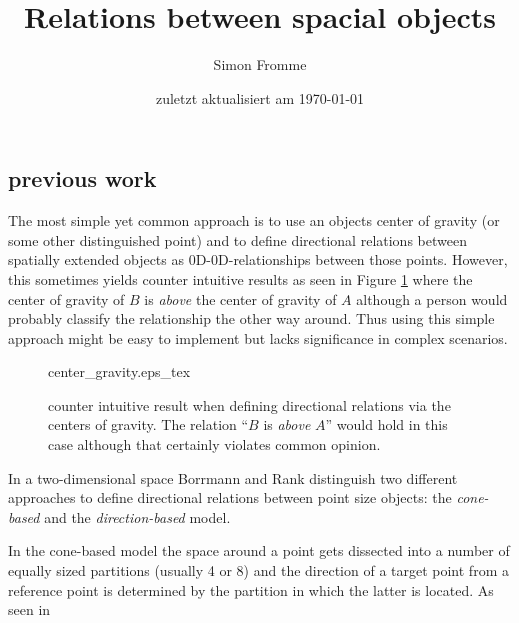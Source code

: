 \message{ !name(Test.tex)}\documentclass[paper=a4, fontsize=11pt]{scrartcl} %
\title{Relations between spacial objects}
\author{Simon Fromme}
\date{\normalsize zuletzt aktualisiert am \today}
\numberwithin{equation}{section} %
\numberwithin{figure}{section} %
\numberwithin{table}{section} %
\begin{document}


\subsection{previous work}
The most simple yet common approach is to use an objects center of gravity (or some other distinguished point) and to define directional relations between spatially extended objects as 0D-0D-relationships between those points. However, this sometimes yields counter intuitive results as seen in Figure \ref{fig:center_gravity} where the center of gravity of $B$ is \emph{above} the center of gravity of $A$ although a person would probably classify the relationship the other way around. Thus using this simple approach might be easy to implement but lacks significance in complex scenarios.

\begin{figure}
  \centering
  \def\svgwidth{8em}
  {center_gravity.eps_tex}
  \caption{counter intuitive result when defining directional relations via the centers of gravity. The relation ``$B$ is \emph{above} $A$'' would hold in this case although that certainly violates common opinion.  }
\label{fig:center_gravity}
\end{figure}

In a two-dimensional space Borrmann and Rank \cite{Borrmann:2009:AEI} distinguish two different approaches to define directional relations between point size objects: the \textit{cone-based} and the \textit{direction-based} model. 

In the cone-based model the space around a point gets dissected into a number of equally sized partitions (usually 4 or 8) and the direction of a target point from a reference point is determined by the partition in which the latter is located. As seen in 
\end{document}

